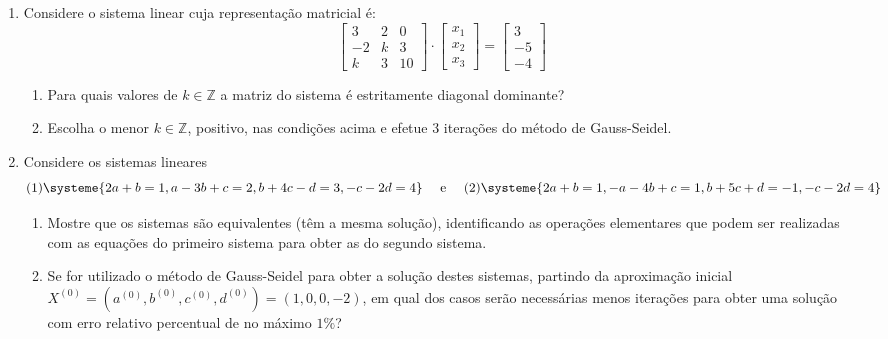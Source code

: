 \documentclass[12pt,a4paper]{article}
\begin{document}
\begin{enumerate}
\item Considere o sistema linear cuja representação matricial é:
\[
\begin{bmatrix}
 3 & 2 & 0 \\
-2 & k & 3 \\
 k & 3 & 10
\end{bmatrix}
\cdot 
\begin{bmatrix}
x_1 \\ x_2 \\ x_3
\end{bmatrix}
=
\begin{bmatrix}
3 \\ -5 \\ -4
\end{bmatrix}
\]
\begin{enumerate}
\item Para quais valores de $k \in \mathbb{Z}$ a matriz do sistema é estritamente diagonal dominante?
\item Escolha o menor $k \in \mathbb{Z}$, positivo, nas condições acima e efetue 3 iterações do método de Gauss-Seidel.
\end{enumerate}
\item Considere os sistemas lineares
\[(1)
\systeme{
2a+b    =1,
a-3b+c  =2,
  b+4c-d=3,
   -c-2d=4
}
\quad\text{ e }\quad
(2)
\systeme{
2a +b    =1,
-a-4b+c  =1,
  b+5c+d=-1,
   -c-2d=4
}
\]
\begin{enumerate}
\item Mostre que os sistemas são equivalentes (têm a mesma solução), identificando as operações elementares que podem ser realizadas com as equações do primeiro sistema para obter as do segundo sistema.
\item Se for utilizado o método de Gauss-Seidel para obter a solução destes sistemas, partindo da aproximação inicial $X^{(0)}=(a^{(0)},b^{(0)},c^{(0)},d^{(0)}) = (1,0,0,-2)$, em qual dos casos serão necessárias menos iterações para obter uma solução com erro relativo percentual de no máximo $1\%$?
\end{enumerate}


\end{enumerate}
\end{document}
